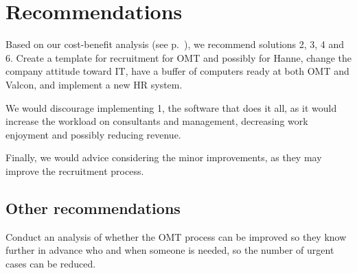 \section{Recommendations}
Based on our cost-benefit analysis (see p.~\pageref{app:cost_benefit_analysis}), we recommend solutions 2, 3, 4 and 6.
Create a template for recruitment for OMT and possibly for Hanne, change the company attitude toward IT, have a buffer of computers ready at both OMT and Valcon, and implement a new HR system.

We would discourage implementing 1, the software that does it all, as it would increase the workload on consultants and management, decreasing work enjoyment and possibly reducing revenue.

Finally, we would advice considering the minor improvements, as they may improve the recruitment process.

\subsection{Other recommendations}
Conduct an analysis of whether the OMT process can be improved so they know further in advance who and when someone is needed, so the number of urgent cases can be reduced.